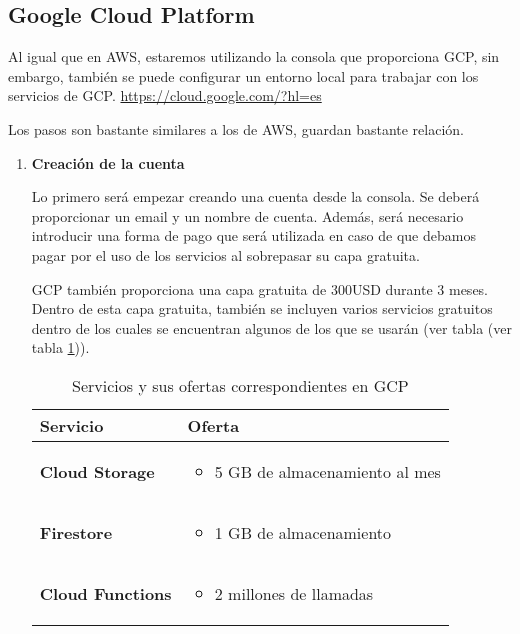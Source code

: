 \subsection{Google Cloud Platform}

Al igual que en AWS, estaremos utilizando la consola que proporciona GCP, sin embargo, también se puede configurar un entorno local para trabajar con los servicios de GCP. \url{https://cloud.google.com/?hl=es}

Los pasos son bastante similares a los de AWS, guardan bastante relación. 

\begin{enumerate}
    \item \textbf{Creación de la cuenta}
    
    Lo primero será empezar creando una cuenta desde la consola.  
    Se deberá proporcionar un email y un nombre de cuenta. Además, será necesario introducir una forma de pago que será utilizada en caso de que debamos pagar por el uso de los servicios al sobrepasar su capa gratuita.

    GCP también proporciona una capa gratuita de 300USD durante 3 meses. Dentro de esta capa gratuita, también se incluyen varios servicios gratuitos dentro de los cuales se encuentran algunos de los que se usarán (ver tabla (ver tabla \ref{tab:servicios_ofertas_gcp})).

    \begin{table}[ht]
\centering
\begin{tabularx}{\linewidth}{lX}
\toprule
\textbf{Servicio} & \textbf{Oferta} \\
\midrule
\textbf{Cloud Storage} & 
\begin{itemize}
    \item 5 GB de almacenamiento al mes
\end{itemize} \\
\midrule
\textbf{Firestore} & 
\begin{itemize}
    \item 1 GB de almacenamiento
\end{itemize} \\
\midrule
\textbf{Cloud Functions} & 
\begin{itemize}
    \item 2 millones de llamadas
\end{itemize} \\
\bottomrule
\end{tabularx}
\caption{Servicios y sus ofertas correspondientes en GCP}
\label{tab:servicios_ofertas_gcp}
\end{table}


\end{enumerate}
